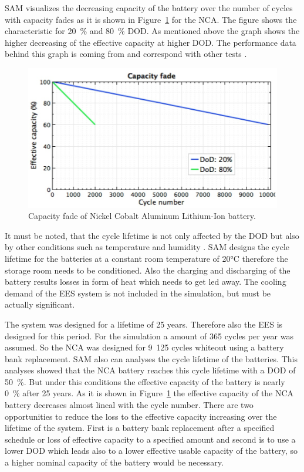 SAM visualizes the decreasing capacity of the battery over the number of cycles with capacity fades as it is shown in Figure~\ref{CapacityFade} for the NCA. The figure shows the characteristic for 20~\% and 80~\% DOD. As mentioned above the graph shows the higher decreasing of the effective capacity at higher DOD. The performance data behind this graph is coming from \cite{Dahn2011} and correspond with other tests \cite{Read2009}.
\begin{figure}[bhtp]  
\centering
\includegraphics[width=0.75\linewidth]{FIG/CapacityFade}
\caption[Capacity fade of Nickel Cobalt Aluminum Lithium-Ion battery.]{Capacity fade of Nickel Cobalt Aluminum Lithium-Ion battery.}\label{CapacityFade}
\end{figure}

It must be noted, that the cycle lifetime is not only affected by the DOD but also by other conditions such as temperature and humidity \cite{MitElectricVehilceTeam2008}. SAM designs the cycle lifetime for the batteries at a constant room temperature of 20\si{\celsius} therefore the storage room needs to be conditioned. Also the charging and discharging of the battery results losses in form of heat which needs to get led away. The cooling demand of the EES system is not included in the simulation, but must be actually significant. \cite{Diorio2015} 



The system was designed for a lifetime of 25 years. Therefore also the EES is designed for this period. For the simulation a amount of 365 cycles per year was assumed. So the NCA was designed for 9~125 cycles whiteout using a battery bank replacement. SAM also can analyses the cycle lifetime of the batteries. This analyses showed that the NCA battery reaches this cycle lifetime with a DOD of 50~\%. But under this conditions the effective capacity of the battery is nearly 0~\% after 25 years. As it is shown in Figure~\ref{CapacityFade} the effective capacity of the NCA battery decreases almost lineal with the cycle number. There are two opportunities to reduce the loss to the effective capacity increasing over the lifetime of the system. First is a battery bank replacement after a specified schedule or loss of effective capacity to a specified amount and second is to use a lower DOD which leads also to a lower effective usable capacity of the battery, so a higher nominal capacity of the battery would be necessary.



